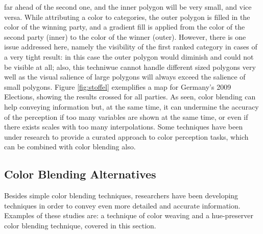 far ahead of the second one, and the inner polygon will be very small, and vice versa. While attributing a color to categories, the outer polygon is filled in
the color of the winning party, and a gradient fill is applied from the color of the second party (inner) to the color of the winner (outer). However, there is one
issue addressed here, namely the visibility of the first ranked category in cases of a very tight result: in this case the outer polygon would diminish and could
not be visible at all; also, this techniwue cannot handle different sized polygons very well as the visual salience of large polygons will always exceed the
salience of small polygons. Figure \ref{fig:stoffel} exemplifies a map for Germany's 2009 Elections, showing the results crossed for all parties.
%
As seen, color blending can help conveying information but, at the same time, it can undermine the accuracy of
the perception if too many variables are shown at the same time, or even if there exists scales with too many
interpolations. Some techniques have been under research to provide a curated approach to color perception
tasks, which can be combined with color blending also.
%
\subsection{Color Blending Alternatives}
Besides simple color blending techniques, researchers have been developing techniques in order to convey
even more detailed and accurate information. Examples of these studies are:
a technique of color weaving and a hue-preserver color blending technique, covered in this section.
%

